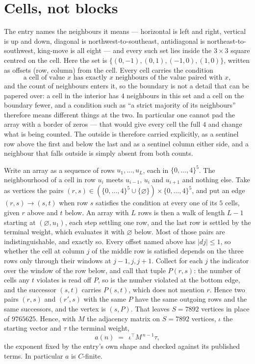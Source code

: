 \documentclass[11pt,a4paper]{article}
\theoremstyle{plain}
\theoremstyle{definition}
\begin{document}
\section{Cells, not blocks}

The entry names the neighbours it means --- horizontal is left and right, vertical is up and
down, diagonal is northwest-to-southeast, antidiagonal is northeast-to-southwest, king-move is
all eight --- and every such set lies inside the $3\times3$ square centred on the cell. Here
the set is $\{(0,-1), (0,1), (-1,0), (1,0)\}$, written as offsets (row, column) from the cell. Every cell carries
the condition
\[
\text{a cell of value }x\text{ has exactly }x\text{ neighbours of the value paired with }x,
\]
and the count of neighbours enters it, so the boundary is not a detail that can be papered
over: a cell in the interior has $4$ neighbours in this set and a cell on the boundary
fewer, and a condition such as ``a strict majority of its neighbours'' therefore means
different things at the two. In particular one cannot pad the array with a border of zeros ---
that would give every cell the full $4$ and change what is being counted. The outside is
therefore carried
explicitly, as a sentinel row above the first and below the last and as a sentinel column
either side, and a neighbour that falls outside is simply absent from both counts.

Write an array as a sequence of rows $u_1,\dots,u_L$, each in
$\{0,\dots,4\}^{5}$. The neighbourhood of a cell in row $u_i$ meets $u_{i-1}$,
$u_i$ and $u_{i+1}$ and nothing else. Take as vertices the pairs
$(r,s)\in(\{0,\dots,4\}^{5}\cup\{\varnothing\})\times\{0,\dots,4\}^{5}$,
and put an edge $(r,s)\to(s,t)$ when row $s$ satisfies the condition at every one of its
$5$ cells, given $r$ above and $t$ below. An array with $L$ rows is then a walk of length
$L-1$ starting at $(\varnothing,u_1)$, each step settling one row, and the last row is
settled by the terminal weight, which evaluates it with $\varnothing$ below. Most of those pairs are indistinguishable, and exactly so. Every offset named above has $|dj|\le 1$, so whether the cell at column $j$ of the middle row is satisfied depends on the three rows only through their windows at $j-1,j,j+1$. Collect for each $j$ the indicator over the window of the row below, and call that tuple $P(r,s)$: the number of cells any $t$ violates is read off $P$, so is the number violated at the bottom edge, and the successor $(s,t)$ carries $P(s,t)$, which does not mention $r$. Hence two pairs $(r,s)$ and $(r',s)$ with the same $P$ have the same outgoing rows and the same successors, and the vertex is $(s,P)$. That leaves $S=7892$ vertices in place of $9765625$. Hence,
with $M$ the adjacency matrix on $S=7892$ vertices, $\iota$ the starting vector and $\tau$ the
terminal weight,
\[
a(n)\;=\;\,\iota^{\!\top}M^{\,n-1}\tau ,
\]
the exponent fixed by the entry's own shape and checked against its published terms. In
particular $a$ is $C$-finite.
\end{document}
